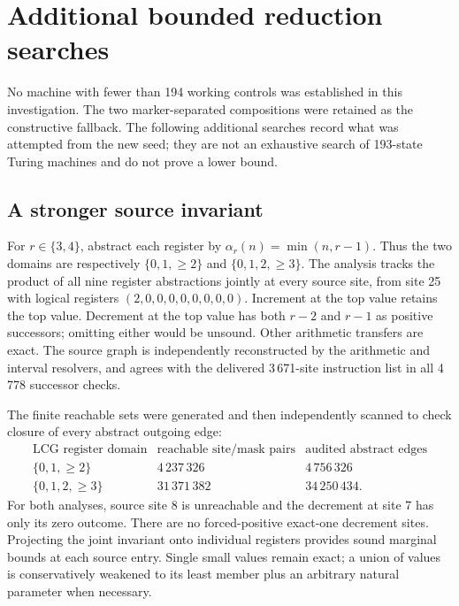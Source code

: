 \section{Additional bounded reduction searches}
\label{sec:ms-search}

No machine with fewer than 194 working controls was established in this
investigation.  The two marker-separated compositions were retained as the
constructive fallback.  The following additional searches record what was
attempted from the new seed; they are not an exhaustive search of 193-state
Turing machines and do not prove a lower bound.

\subsection{A stronger source invariant}
For $r\in\{3,4\}$, abstract each register by
$\alpha_r(n)=\min(n,r-1)$.  Thus the two domains are respectively
$\{0,1,{\geq}2\}$ and $\{0,1,2,{\geq}3\}$.
The analysis tracks the product of all nine register abstractions jointly
at every source site, from site 25 with logical registers
$(2,0,0,0,0,0,0,0,0)$.  Increment at the top value retains the top value.
Decrement at the top value has both $r-2$ and $r-1$ as positive successors;
omitting either would be unsound.  Other arithmetic transfers are exact.
The source graph is independently reconstructed by the arithmetic and
interval resolvers, and agrees with the delivered 3\,671-site instruction
list in all 4\,778 successor checks.

The finite reachable sets were generated and then independently scanned
to check closure of every abstract outgoing edge:
\[
\begin{array}{lrr}
\text{LCG register domain}&\text{reachable site/mask pairs}&
  \text{audited abstract edges}\\\hline
\{0,1,{\geq}2\}&4\,237\,326&4\,756\,326\\
\{0,1,2,{\geq}3\}&31\,371\,382&34\,250\,434.
\end{array}
\]
For both analyses, source site 8 is unreachable and the decrement at site 7
has only its zero outcome.  There are no forced-positive exact-one
decrement sites.  Projecting the joint invariant onto individual registers
provides sound marginal bounds at each source entry.  Single small values
remain exact; a union of values is conservatively weakened to its least
member plus an arbitrary natural parameter when necessary.

